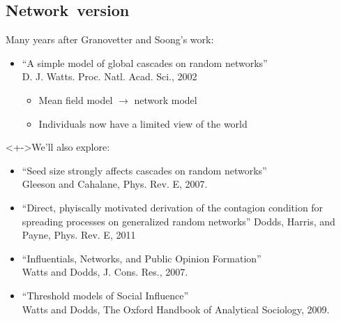 





\subsection{Network\ version}

\begin{frame}

  \small
  \begin{block}{Many years after Granovetter and Soong's work:}
    \begin{itemize}
    \item<+-> 
      ``A simple model of global cascades on random networks''\\      
      D. J. Watts.  Proc. Natl. Acad. Sci., 2002\cite{watts2002a}
      \begin{itemize}
      \item<+-> 
        Mean field model $\rightarrow$ network model
      \item<+-> 
        Individuals now have a limited view of the world
      \end{itemize}
    \end{itemize}
  \end{block}

  \begin{block}<+->{We'll also explore:}
    \begin{itemize}
    \item 
      ``Seed size strongly affects cascades on random networks''\cite{gleeson2007a}\\
      Gleeson and Cahalane, Phys. Rev. E, 2007.
    \item
      ``Direct, phyiscally motivated derivation of the contagion condition for spreading processes on generalized random networks''\cite{dodds2011b}
      Dodds, Harris, and Payne, Phys. Rev. E, 2011
    \item 
      ``Influentials, Networks, and Public Opinion Formation''\cite{watts2007a}\\
      Watts and Dodds, J. Cons. Res., 2007.
    \item 
      ``Threshold models of Social Influence''\cite{watts2009a}\\
      Watts and Dodds, The Oxford Handbook of Analytical Sociology, 2009.
    \end{itemize}
  \end{block}


\end{frame}

